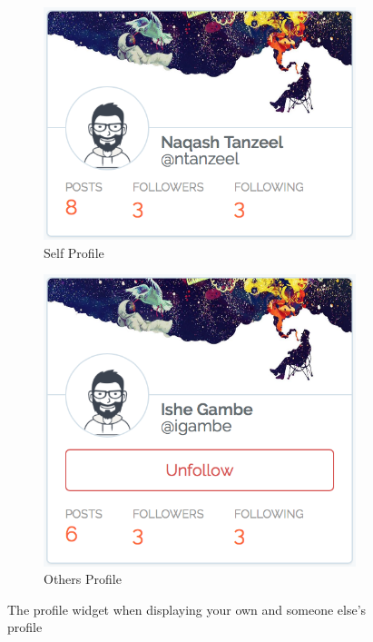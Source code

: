 \begin{figure}[H]
    \centering
    \begin{subfigure}[b]{0.5\linewidth}
        \includegraphics[width=1\textwidth]{Images/Design/UI/Widgets/Profile_Self}
        \caption{Self Profile}
        \label{fig:ProfileWidget_Self}
    \end{subfigure}
    \begin{subfigure}[b]{0.4\linewidth}
        \includegraphics[width=1\textwidth]{Images/Design/UI/Widgets/Profile_Other}
        \caption{Others Profile}
        \label{fig:ProfileWidget_Other}
    \end{subfigure}
    \caption{The profile widget when displaying your own and someone else's profile}
    \label{fig:ProfileWidget}
\end{figure}


